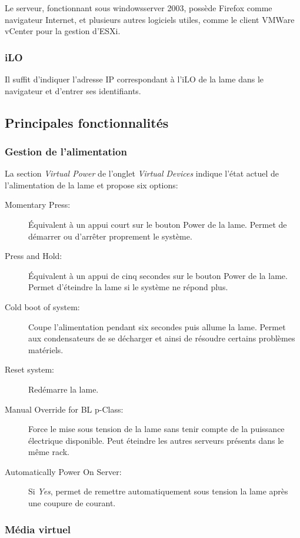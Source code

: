\documentclass[a4paper,oneside]{report}
\begin{document}
Le serveur, fonctionnant sous \gls{windowsserver} 2003, possède Firefox comme navigateur Internet, et plusieurs autres logiciels utiles, comme le client VMWare vCenter pour la gestion d'ESXi.

\subsubsection{iLO}
Il suffit d'indiquer l'adresse IP correspondant à l'iLO de la lame dans le navigateur et d'entrer ses identifiants.
\newpage

\subsection{Principales fonctionnalités}
\subsubsection{Gestion de l'alimentation}
La section \emph{Virtual Power} de l'onglet \emph{Virtual Devices} indique l'état actuel de l'alimentation de la lame et propose six options:
\begin{description}
\item[Momentary Press:] Équivalent à un appui court sur le bouton Power de la lame.
Permet de démarrer ou d'arrêter proprement le système.
\item[Press and Hold:] Équivalent à un appui de cinq secondes sur le bouton Power de la lame.
Permet d'éteindre la lame si le système ne répond plus.
\item[Cold boot of system:] Coupe l'alimentation pendant six secondes puis allume la lame.
Permet aux condensateurs de se décharger et ainsi de résoudre certains problèmes matériels.
\item[Reset system:] Redémarre la lame.
\item[Manual Override for BL p-Class:] Force le mise sous tension de la lame sans tenir compte de la puissance électrique disponible.
Peut éteindre les autres serveurs présents dans le même rack.
\item[Automatically Power On Server:] Si \emph{Yes}, permet de remettre automatiquement sous tension la lame après une coupure de courant.
\end{description}

\subsubsection{Média virtuel}
\end{document}
